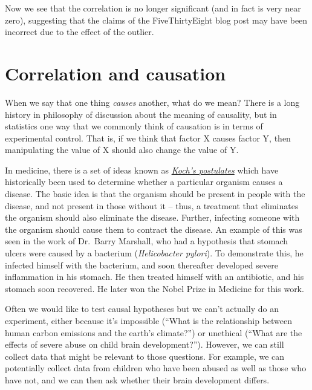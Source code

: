 \documentclass[
  12pt,
]{book}
\begin{document}
Now we see that the correlation is no longer significant (and in fact is very near zero), suggesting that the claims of the FiveThirtyEight blog post may have been incorrect due to the effect of the outlier.

\hypertarget{correlation-and-causation}{%
\section{Correlation and causation}\label{correlation-and-causation}}

When we say that one thing \emph{causes} another, what do we mean? There is a long history in philosophy of discussion about the meaning of causality, but in statistics one way that we commonly think of causation is in terms of experimental control. That is, if we think that factor X causes factor Y, then manipulating the value of X should also change the value of Y.

In medicine, there is a set of ideas known as \href{https://en.wikipedia.org/wiki/Koch\%27s_postulates}{\emph{Koch's postulates}} which have historically been used to determine whether a particular organism causes a disease. The basic idea is that the organism should be present in people with the disease, and not present in those without it -- thus, a treatment that eliminates the organism should also eliminate the disease. Further, infecting someone with the organism should cause them to contract the disease. An example of this was seen in the work of Dr.~Barry Marshall, who had a hypothesis that stomach ulcers were caused by a bacterium (\emph{Helicobacter pylori}). To demonstrate this, he infected himself with the bacterium, and soon thereafter developed severe inflammation in his stomach. He then treated himself with an antibiotic, and his stomach soon recovered. He later won the Nobel Prize in Medicine for this work.

Often we would like to test causal hypotheses but we can't actually do an experiment, either because it's impossible (``What is the relationship between human carbon emissions and the earth's climate?'') or unethical (``What are the effects of severe abuse on child brain development?''). However, we can still collect data that might be relevant to those questions. For example, we can potentially collect data from children who have been abused as well as those who have not, and we can then ask whether their brain development differs.
\end{document}
